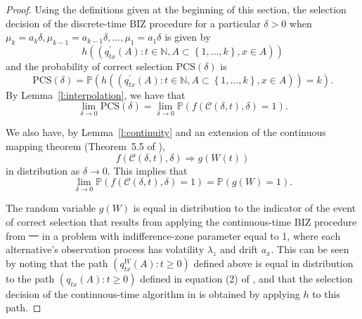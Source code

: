 \documentclass{wscpaperproc}
\theoremstyle{wsc}
\providecommand{\DIFaddtex}[1]{{\protect\color{blue}\uwave{#1}}} %
\providecommand{\DIFdeltex}[1]{{\protect\color{red}\sout{#1}}}                      %
\providecommand{\DIFaddbegin}{} %
\providecommand{\DIFaddend}{} %
\providecommand{\DIFdelbegin}{} %
\providecommand{\DIFdelend}{} %
\providecommand{\DIFadd}[1]{\texorpdfstring{\DIFaddtex{#1}}{#1}} %
\providecommand{\DIFdel}[1]{\texorpdfstring{\DIFdeltex{#1}}{}} %
\begin{document}
\begin{proof}
Using the definitions given at the beginning of this section,
the selection decision of the discrete-time BIZ procedure for a particular $\delta>0$ when $\mu_{k}=a_{k}\delta,\mu_{k-1}=a_{k-1}\delta,\ldots,\mu_{1}=a_{1}\delta$ is given by
\begin{equation*}
h\left(\left(q_{tx}^{'}\left(A\right):t\in\mathbb{N},A\subset\left\{ 1,\ldots,k\right\} ,x\in A\right)\right)
\end{equation*}
and the probability of correct selection $\mbox{PCS}(\delta)$ is
\begin{equation*}
    \mbox{PCS}(\delta) =  \mathbb{P}\left( h\left( \left(q_{tx}^{'}\left(A\right):t\in\mathbb{N},A\subset\left\{ 1,\ldots,k\right\} ,x\in A\right) \right) =k\right).
\end{equation*}
By Lemma~\ref{l:interpolation}, we have that 
\begin{equation}
\lim_{\delta\to0}
\mbox{PCS}(\delta)
 = \lim_{\delta\rightarrow0}
 \mathbb{P}\left(
 f\left(\mathcal{C}\left(\delta,t\right),\delta\right)=1
 \right).
 \label{eq:convergence1}
\end{equation}

We also have, by Lemma~\ref{l:continuity} and an extension of the continuous mapping theorem (Theorem~5.5 of ), 
\begin{equation*}
    f\left(\mathcal{C}\left(\delta,t\right),\delta\right)\Rightarrow g\left(W\left(t\right)\right)
\end{equation*}
in distribution as $\delta\rightarrow0$.
This implies that
\begin{equation}
\lim_{\delta\rightarrow0}\mathbb{P}\left(f\left(\mathcal{C}\left(\delta,t\right),\delta\right)=1\right)
 = \mathbb{P}\left(g\left(W\right)=1\right).
 \label{eq:convergence2}
\end{equation}

The random variable $g(W)$ is equal in distribution to the indicator of the event of correct selection that results from applying the continuous-time BIZ procedure from \DIFdelbegin \DIFdel{\mbox{%
\cite{Frazier:BIZ}
}%
}\DIFdelend \DIFaddbegin \DIFadd{\mbox{%
}%
}\DIFaddend in a problem with indifference-zone parameter equal to 1, where each alternative's observation process has volatility $\lambda_z$ and drift $a_x$.
This can be seen by noting that the path $(q^{W}_{tx}(A) : t\ge0)$ defined above is equal in distribution to the path $(q_{tx}(A) : t\ge0)$ defined in equation (2) of , and that the selection decision of the continuous-time algorithm in  is obtained by applying $h$ to this path.


\end{proof}
\end{document}
